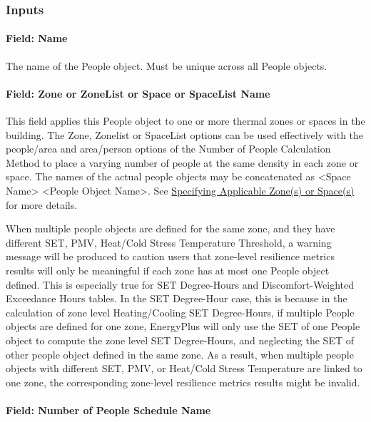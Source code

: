 \subsubsection{Inputs}\label{inputs-025}

\paragraph{Field: Name}\label{field-name-024}

The name of the People object. Must be unique across all People objects.

\paragraph{Field: Zone or ZoneList or Space or SpaceList Name}\label{field-zone-or-zonelist-name-000}

This field applies this People object to one or more thermal zones or spaces in the building. The Zone, Zonelist or SpaceList options can be used effectively with the people/area and area/person options of the Number of People Calculation Method to place a varying number of people at the same density in each zone or space. The names of the actual people objects may be concatenated as \textless{}Space Name\textgreater{} \textless{}People Object Name\textgreater{}. See \hyperref[specifying-applicable-zones-or-spaces]{Specifying Applicable Zone(s) or Space(s)} for more details.

When multiple people objects are defined for the same zone, and they have
different SET, PMV, Heat/Cold Stress Temperature Threshold, a warning message
will be produced to caution users that zone-level resilience metrics results
will only be meaningful if each zone has at most one People object defined. This
is especially true for SET Degree-Hours and Discomfort-Weighted Exceedance Hours
tables. In the SET Degree-Hour case, this is because in the calculation of zone
level Heating/Cooling SET Degree-Hours, if multiple People objects are defined
for one zone, EnergyPlus will only use the SET of one People object to compute
the zone level SET Degree-Hours, and neglecting the SET of other people object
defined in the same zone. As a result, when multiple people objects with
different SET, PMV, or Heat/Cold Stress Temperature are linked to one zone, the
corresponding zone-level resilience metrics results might be invalid.

\paragraph{Field: Number of People Schedule Name}\label{field-number-of-people-schedule-name}

